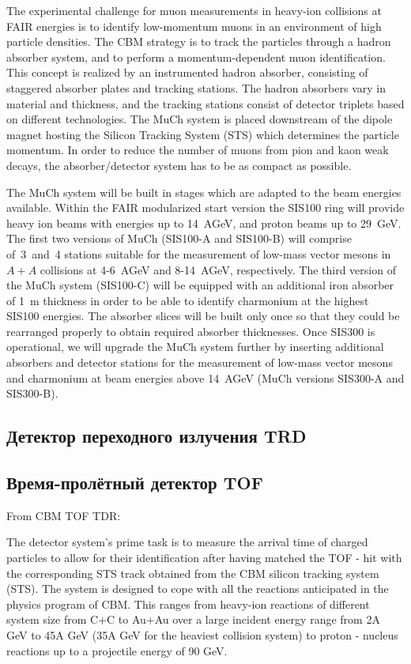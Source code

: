 The experimental challenge for muon measurements in heavy-ion collisions at FAIR energies is to identify low-momentum muons in an environment of high particle densities. The CBM strategy is to track the particles through a hadron absorber system, and to perform a momentum-dependent muon identification. This concept is realized by an instrumented hadron absorber, consisting of staggered absorber plates and tracking stations. The hadron absorbers vary in material and thickness, and the tracking stations consist of detector triplets based on different technologies. The MuCh system is placed downstream of the dipole magnet hosting the Silicon Tracking System (STS) which determines the particle momentum. In order to reduce the number of muons from pion and kaon weak decays, the absorber/detector system has to be as compact as possible.

The MuCh system will be built in stages which are adapted to the beam energies available. Within the FAIR modularized start version the SIS100 ring will provide heavy ion beams with energies up to 14~AGeV, and proton beams up to 29~GeV. The first two versions of MuCh (SIS100-A and SIS100-B) will comprise of~3~and~4 stations suitable for the measurement of low-mass vector mesons in $ A + A $ collisions at 4-6~AGeV and 8-14~AGeV, respectively. The third version of the MuCh system (SIS100-C) will be equipped with an additional iron absorber of 1~m thickness in order to be able to identify charmonium at the highest SIS100 energies. The absorber slices will be built only once so that they could be rearranged properly to obtain required absorber thicknesses. Once SIS300 is operational, we will upgrade the MuCh system further by inserting additional absorbers and detector stations for the measurement of low-mass vector mesons and charmonium at beam energies above 14~AGeV (MuCh versions SIS300-A and SIS300-B).

\subsection{Детектор переходного излучения TRD}\label{sec:secTRD}

\subsection{Время-пролётный детектор TOF}\label{sec:secTOF}

From CBM TOF TDR:

The detector system’s prime task is to measure the arrival time of charged particles to allow for their identification after having matched the TOF - hit with the corresponding STS track obtained from the CBM silicon tracking system (STS). The system is designed to cope with all the reactions anticipated in the physics program of CBM. This ranges from heavy-ion reactions of different system size from C+C to Au+Au over a large incident energy range from 2A GeV to 45A GeV (35A GeV for the heaviest collision system) to proton - nucleus reactions up to a projectile energy of 90 GeV.

